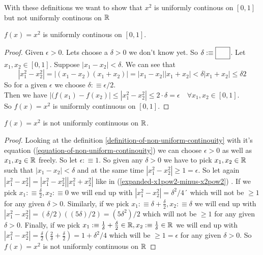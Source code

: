 With these definitions we want to show that $x^2$ is uniformly continous on $[0,1]$ but not uniformly continous on $\mathbb{R}$

\begin{thm}
	$f(x)=x^2$ is uniformly continous on $[0,1]$.
\end{thm}
\begin{proof}
	Given $\epsilon > 0$. Lets choose a $\delta>0$ we don't know yet. So $\delta :\equiv \boxed{\color{white}\epsilon/2}$. Let $x_1, x_2 \in [0,1]$. Suppose $|x_1-x_2| < \delta$. We can see that \begin{equation}
		\label{expanded-x1pow2-minus-x2pow2}
		|x_1^2 - x_2^2| = |(x_1 - x_2)(x_1+x_2)| = |x_1 - x_2||x_1+x_2| < \delta |x_1+x_2| \leq \delta 2 
	\end{equation}
	So for a given $\epsilon$ we choose $\delta :\equiv \boxed{\epsilon/2}$. \\
	Then we have $|(f(x_1)-f(x_2)| \leq |x_1^2 - x_2^2| \leq 2\cdot \delta  = \epsilon \quad \forall x_1, x_2 \in [0,1]$.\\
	So $f(x)=x^2$ is uniformly continuous on $[0,1]$.
\end{proof}

\begin{thm}
	$f(x)=x^2$ is not uniformly continuous on $\mathbb{R}$.
\end{thm}
\begin{proof}
	Looking at the definition \ref{definition-of-non-uniform-continouity} with it's equation (\ref{equation-of-non-uniform-continouity}) we can choose $\epsilon>0$ as well as $x_1, x_2 \in \mathbb{R}$ freely. So let $\epsilon : \equiv 1$. So given any $\delta > 0 $ we have to pick $x_1, x_2 \in \mathbb{R}$ such that $|x_1-x_2|<\delta$ and at the same time $|x_1^2-x_2^2|\geq1=\epsilon$. So let again $|x_1^2-x_2^2|=|x_1^2-x_2^2||x_1^2+x_2^2|$ like in (\ref*{expanded-x1pow2-minus-x2pow2}) . If we pick $x_1 :\equiv\frac{\delta}{2}, x_2 :\equiv 0$ we will end up with $|x_1^2-x_2^2|= \delta^2/4´$ which will not be $\geq 1$ for any given $\delta>0$. Similarly, if we pick $x_1 : \equiv \delta + \frac{\delta}{2}, x_2 :\equiv \delta$ we will end up with $|x_1^2-x_2^2|= (\delta/2)((5\delta)/2)=(5\delta^2)/2$ which will not be $\geq 1$ for any given $\delta>0$.
	Finally, if we pick $x_1 : \equiv \frac{1}{\delta} + \frac{\delta}{2} \in \mathbb{R}, x_2 :\equiv \frac{1}{\delta} \in \mathbb{R}$ we will end up with $|x_1^2-x_2^2|= \frac{\delta}{2} (\frac{2}{\delta}+\frac{\delta}{2})=1+\delta^2/4$ which will  be $\geq 1=\epsilon$ for any given $\delta>0$. So $f(x)=x^2$ is not uniformly continuous on $\mathbb{R}$
\end{proof}

